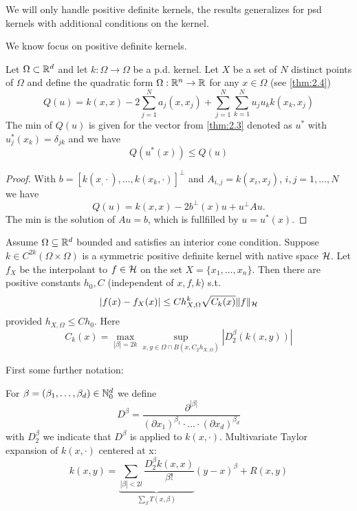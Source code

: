 \begin{aremark}
    We will only handle positive definite kernels, the results generalizes for psd kernels with additional conditions on the kernel.
\end{aremark}

We know focus on positive definite kernels. 
\begin{theorem}\label{thm:31}
    Let $\Omega\subset \mathbb{R}^d$ and let $k:\Omega\to\Omega$ be a p.d. kernel. 
    Let $X$ be a set of $N$ distinct points of $\Omega$ and define the quadratic form 
    $\Omega:\mathbb{R}^n\to\mathbb{R}$ for any $x\in\Omega$ (see \ref{thm:2.4})
    \[Q(u)=k(x,x)-2\sum_{j=1}^N a_j(x,x_j)+\sum_{j=1}^{N}\sum_{k=1}^{N}u_ju_kk(x_k,x_j)\]
    The min of $Q(u)$ is given for the vector from \ref{thm:2.3} denoted as $u^*$ with 
    $u_j^*(x_k)=\delta_{jk}$ and we have \[Q(u^*(x))\leq Q(u)\]
\end{theorem}

\begin{proof}
    With $b=[k(x_,\cdot),\dots,k(x_k,\cdot)]^\perp$ and $A_{i,j}=k(x_i,x_j)$, $i,j=1,\dots,N$ 
    we have 
    \[ Q(u)=k(x,x)-2 b^\perp (x)u+u^\perp A u.\]
    The min is the solution of $Au=b$,
    which is fullfilled by $u=u^*(x)$.
\end{proof}

\begin{theorem}\label{thm:32}
    Assume $\Omega\subseteq \mathbb{R}^d$ bounded and satisfies an interior cone condition.
    Suppose $k\in C^{2k}(\Omega\times \Omega)$ is a symmetric positive definite kernel 
    with native space $\mathcal{H}$. Let $f_X$ be the interpolant to $f\in\mathcal{H}$ on the set $X=\{x_1,\dots,x_n\}$.
    Then there are positive constants $h_0,C$ (independent of $x,f,k$) s.t. 
    \begin{equation*}
        |f(x)-f_X(x)|\leq Ch_{X,\Omega}^k \sqrt{C_k(x)}\Vert f\Vert_{\mathcal{H}}
    \end{equation*} 
    provided $h_{X,\Omega}\leq Ch_0$. Here 
    \[C_k(x)=\max_{|\beta|=2k} \sup_{x,y\in \Omega\cap B(x,C_2h_{X,\Omega})}\left\vert D_2^\beta (k(x,y))\right\vert\]
\end{theorem}

First some further notation:

For $\beta=(\beta_1,\dots,\beta_d)\in\mathbb{N}_0^d$ we define 
\[D^\beta=\frac{\partial^{|\beta|}}{(\partial x_1)^{\beta_1}\cdot\dots\cdot (\partial x_d)^{\beta_d}}\]
with $D_2^\beta$ we indicate that $D^\beta$ is applied to $k(x,\cdot)$. Multivariate 
Taylor expansion of $k(x,\cdot)$ centered at x:
\[k(x,y)=\underbrace{\sum_{|\beta|<2l}\frac{D_2^\beta k(x,x)}{\beta!}}_{\sum_\beta T(x,\beta)}(y-x)^\beta+R(x,y)\] 


